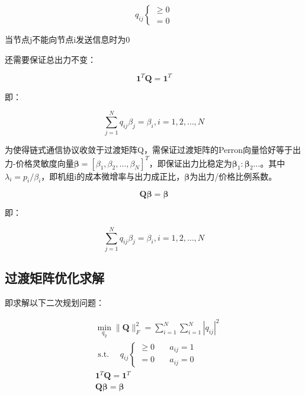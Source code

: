 \begin{equation}
    q_{i j}\left\{\begin{array}{l}
    {\geq 0} \\
    {=0}
    \end{array}\right.
\end{equation}

当节点j不能向节点i发送信息时为0

还需要保证总出力不变：

\begin{equation}
    \mathbf{1}^{T} \mathbf{Q}=\mathbf{1}^{T}
\end{equation}

即：

\begin{equation}
    \sum_{j=1}^{N} q_{i j} \beta_{j}=\beta_{i}, i=1,2, \ldots, N
\end{equation}

为使得链式通信协议收敛于过渡矩阵Q，需保证过渡矩阵的Perron向量恰好等于出力-价格灵敏度向量$\boldsymbol{\beta}=\left[\beta_{1}, \beta_{2}, \ldots, \beta_{N}\right]^{T}$，即保证出力比稳定为$\boldsymbol{\beta}_{1}: \boldsymbol{\beta}_{2} \ldots$。其中$\lambda_{i}=p_{i} / \beta_{i}$，即机组i的成本微增率与出力成正比，$\boldsymbol{\beta}$为出力/价格比例系数。

\begin{equation}
    \mathbf{Q} \boldsymbol{\beta}=\boldsymbol{\beta}
\end{equation}

即：

\begin{equation}
    \sum_{j=1}^{N} q_{i j} \beta_{j}=\beta_{i}, i=1,2, \ldots, N
\end{equation}

\subsection{过渡矩阵优化求解}

即求解以下二次规划问题：

\begin{equation}
    \begin{aligned}
    &\min _{q_{y}}\|\mathbf{Q}\|_{F}^{2}=\sum_{i=1}^{N} \sum_{i=1}^{N}\left|q_{i j}\right|^{2}\\
    &\text { s.t. } \quad q_{i j}\left\{\begin{array}{ll}
    {\geq 0} & {\quad a_{i j}=1} \\
    {=0} & {\quad a_{i j}=0}
    \end{array}\right.\\
    &\mathbf{1}^{T} \mathbf{Q}=\mathbf{1}^{T}\\
    &\mathbf{Q} \boldsymbol{\beta}=\boldsymbol{\beta}
    \end{aligned}
\end{equation}

